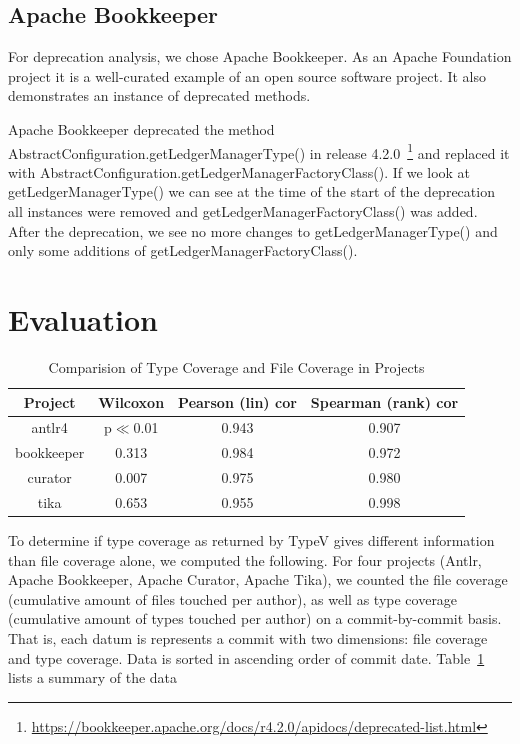 \documentclass[conference]{IEEEtran}
\begin{document}
\subsection{Apache Bookkeeper}

For deprecation analysis, we chose Apache Bookkeeper. As an Apache Foundation project it is a well-curated example of an open source software project. It also demonstrates an instance of deprecated methods. 

Apache Bookkeeper deprecated the method AbstractConfiguration.getLedgerManagerType() in release 4.2.0~\footnote{\url{https://bookkeeper.apache.org/docs/r4.2.0/apidocs/deprecated-list.html}} and replaced it with AbstractConfiguration.getLedgerManagerFactoryClass(). If we look at getLedgerManagerType() we can see at the time of the start of the deprecation all instances were removed and getLedgerManagerFactoryClass() was added. After the deprecation, we see no more changes to getLedgerManagerType() and only some additions of getLedgerManagerFactoryClass().

\section{Evaluation}

\begin{table}[!t]
\renewcommand{\arraystretch}{1.3}
\caption{Comparision of Type Coverage and File Coverage in Projects}
\label{tab:summary}
\centering
\begin{tabular}{c|ccc}
\hline
\bfseries Project & \bfseries Wilcoxon & \bfseries Pearson (lin) cor & \bfseries Spearman (rank) cor \\
\hline
antlr4 & p$\ll$0.01 & 0.943 & 0.907\\
bookkeeper & 0.313 & 0.984 & 0.972\\
curator & 0.007 & 0.975 & 0.980\\
tika & 0.653 & 0.955 & 0.998\\
\hline
\end{tabular}
\end{table}

To determine if type coverage as returned by TypeV gives different information than file coverage alone, we computed the following. For four projects (Antlr, Apache Bookkeeper, Apache Curator, Apache Tika), we counted the file coverage (cumulative amount of files touched per author), as well as type coverage (cumulative amount of types touched per author) on a commit-by-commit basis. That is, each datum is represents a commit with two dimensions: file coverage and type coverage. Data is sorted in ascending order of commit date. Table~\ref{tab:summary} lists a summary of the data 
\end{document}

